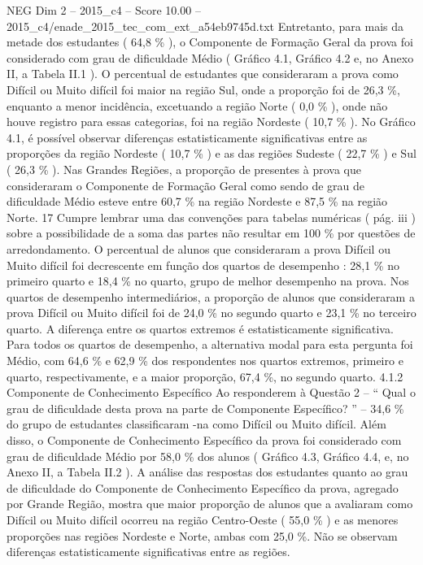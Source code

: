 \begin{textsample}{NEG Dim 2 – 2015\_c4 – Score 10.00 – 2015\_c4/enade\_2015\_tec\_com\_ext\_a54eb9745d.txt}
Entretanto, para mais da metade dos estudantes ( 64,8 \% ), o Componente de Formação Geral da prova foi considerado com grau de dificuldade Médio ( Gráfico 4.1, Gráfico 4.2 e, no Anexo II, a Tabela II.1 ).
O percentual de estudantes que consideraram a prova como Difícil ou Muito difícil foi maior na região Sul, onde a proporção foi de 26,3 \%, enquanto a menor incidência, excetuando a região Norte ( 0,0 \% ), onde não houve registro para essas categorias, foi na região Nordeste ( 10,7 \% ).
No Gráfico 4.1, é possível observar diferenças estatisticamente significativas entre as proporções da região Nordeste ( 10,7 \% ) e as das regiões Sudeste ( 22,7 \% ) e Sul ( 26,3 \% ).
Nas Grandes Regiões, a proporção de presentes à prova que consideraram o Componente de Formação Geral como sendo de grau de dificuldade Médio esteve entre 60,7 \% na região Nordeste e 87,5 \% na região Norte. 17 Cumpre lembrar uma das convenções para tabelas numéricas ( pág. iii ) sobre a possibilidade de a soma das partes não resultar em 100 \% por questões de arredondamento.
O percentual de alunos que consideraram a prova Difícil ou Muito difícil foi decrescente em função dos quartos de desempenho : 28,1 \% no primeiro quarto e 18,4 \% no quarto, grupo de melhor desempenho na prova.
Nos quartos de desempenho intermediários, a proporção de alunos que consideraram a prova Difícil ou Muito difícil foi de 24,0 \% no segundo quarto e 23,1 \% no terceiro quarto.
A diferença entre os quartos extremos é estatisticamente significativa.
Para todos os quartos de desempenho, a alternativa modal para esta pergunta foi Médio, com 64,6 \% e 62,9 \% dos respondentes nos quartos extremos, primeiro e quarto, respectivamente, e a maior proporção, 67,4 \%, no segundo quarto. 4.1.2 Componente de Conhecimento Específico Ao responderem à Questão 2 – “ Qual o grau de dificuldade desta prova na parte de Componente Específico? ” – 34,6 \% do grupo de estudantes classificaram -na como Difícil ou Muito difícil.
Além disso, o Componente de Conhecimento Específico da prova foi considerado com grau de dificuldade Médio por 58,0 \% dos alunos ( Gráfico 4.3, Gráfico 4.4, e, no Anexo II, a Tabela II.2 ).
A análise das respostas dos estudantes quanto ao grau de dificuldade do Componente de Conhecimento Específico da prova, agregado por Grande Região, mostra que maior proporção de alunos que a avaliaram como Difícil ou Muito difícil ocorreu na região Centro-Oeste ( 55,0 \% ) e as menores proporções nas regiões Nordeste e Norte, ambas com 25,0 \%.
Não se observam diferenças estatisticamente significativas entre as regiões.

\end{textsample}
